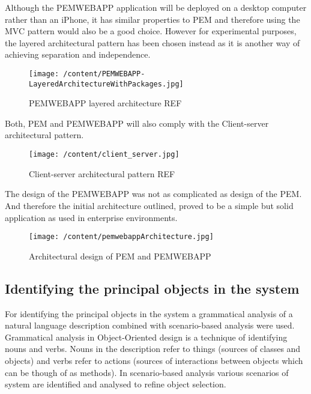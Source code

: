 \documentclass[12pt, a4paper]{report}   %
\begin{document}
\begin{enumerate}
Although the PEMWEBAPP application will be deployed on a desktop computer rather than an iPhone, it has similar properties to PEM and therefore using the MVC pattern would also be a good choice. However for experimental purposes, the layered architectural pattern has been chosen instead as it is another way of achieving separation and independence.\\


\begin{figure}[H]
  \centering
	\texttt{[image: /content/PEMWEBAPP-LayeredArchitectureWithPackages.jpg]}
	  \caption{PEMWEBAPP layered architecture REF}
\end{figure}
 

Both, PEM and PEMWEBAPP will also comply with the Client-server architectural pattern. \\
 
 
\begin{figure}[H]
  \centering
	\texttt{[image: /content/client\_server.jpg]}
	  \caption{Client-server architectural pattern REF}
\end{figure}
 
 
The design of the PEMWEBAPP was not as complicated as design of the PEM. And therefore the initial architecture outlined, proved to be a simple but solid application as used in enterprise environments.


\begin{figure}[H]
\begin{sideways}
\begin{minipage}{19cm}
	\texttt{[image: /content/pemwebappArchitecture.jpg]}
	\caption{Architectural design of PEM and PEMWEBAPP}
\end{minipage}
\end{sideways}
\centering
\end{figure}
 

\clearpage
\subsection{Identifying the principal objects in the system}
For identifying the principal objects in the system a grammatical analysis of a natural language description combined with scenario-based analysis were used. Grammatical analysis in Object-Oriented design is a technique of identifying nouns and verbs. Nouns in the description refer to things (sources of classes and objects) and verbs refer to actions (sources of interactions between objects which can be though of as methods). In scenario-based analysis various scenarios of system are identified and analysed to refine object selection.\\ \\



\end{enumerate}
\end{document}
